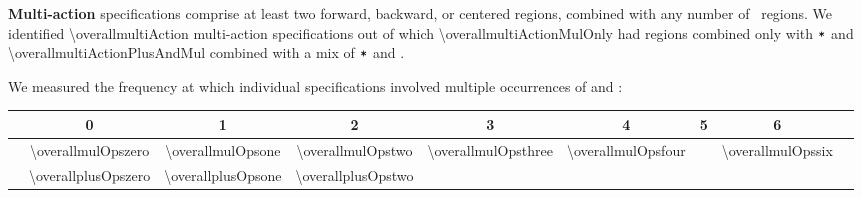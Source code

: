 \textbf{Multi-action} specifications comprise at least two
 forward, backward, or centered regions, combined with
any number of \pointed\ regions. We identified \num{\overallmultiAction} multi-action
specifications out of which \num{\overallmultiActionMulOnly} had regions combined only with
$\texttt{*}$ and \num{\overallmultiActionPlusAndMul} combined with a mix of $\texttt{*}$ and \term{+}.




We measured the frequency at which individual specifications involved
multiple occurrences of \term{*}
and \term{+}:
\begin{center}
\vspace{0.25em}
\setlength{\tabcolsep}{0.57em}
{\small{
\hspace{-1em}\begin{tabular}{c|cccccccc}
& 0 & 1 & 2 & 3 & 4 & 5 & 6  \\ \hline
\term{*} & \num{\overallmulOpszero} & \num{\overallmulOpsone} & \num{\overallmulOpstwo} & \num{\overallmulOpsthree} & \num{\overallmulOpsfour} &  & \num{\overallmulOpssix} \\
\term{+} & \num{\overallplusOpszero} & \num{\overallplusOpsone} & \num{\overallplusOpstwo}
\end{tabular}}}
\vspace{0.2em}
\end{center}

